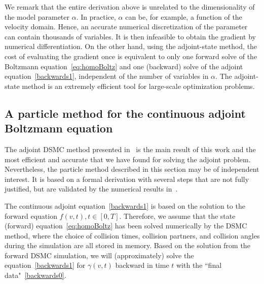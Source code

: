 \documentclass[times,final,nopreprintline]{elsarticle}
\begin{document}
We remark that the entire derivation above is unrelated to the dimensionality of the model parameter $\alpha$. In practice, $\alpha$ can be, for example, a function of the velocity domain.  Hence, an accurate numerical discretization of the parameter can contain thousands of variables. It is then infeasible to obtain the gradient by numerical differentiation. On the other hand, using the adjoint-state method, the cost of evaluating the gradient once is equivalent to only one forward solve of the Boltzmann equation~\eqref{eq:homoBoltz} and one (backward) solve of the adjoint equation~\eqref{backwards1}, independent of the number of variables in $\alpha$. The adjoint-state method is an extremely efficient tool for large-scale optimization problems.








\subsection{A particle method for the continuous adjoint Boltzmann equation}  \label{sec:DSMCtype_method}
The adjoint DSMC method presented in~ is the main result of this work and the most efficient and accurate that we have found for solving the adjoint problem. Nevertheless, the particle method described in this section may be of independent interest.  It is based on a formal derivation with several steps that are not fully justified, but are validated by the numerical results  in~. 


The continuous adjoint equation~\eqref{backwards1} is based on the solution to the forward equation $f(v,t), t\in [0,T]$. Therefore, we assume that the state (forward) equation~\eqref{eq:homoBoltz} has been solved numerically by the DSMC method, where the choice of collision times, collision partners, and collision angles during the simulation are all stored in memory. Based on the solution from the forward DSMC simulation, we will (approximately) solve the equation~\eqref{backwards1} for $\gamma(v,t)$ backward in time $t$ with the ``final data"~\eqref{backwards0}.
\end{document}
